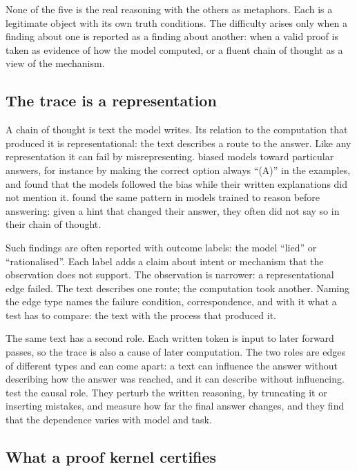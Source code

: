 None of the five is the real reasoning with the others as metaphors. Each is a legitimate
object with its own truth conditions. The difficulty arises only when a finding about one
is reported as a finding about another: when a valid proof is taken as evidence of how
the model computed, or a fluent chain of thought as a view of the mechanism.

\subsection{The trace is a representation}

A chain of thought is text the model writes. Its relation to the computation that
produced it is representational: the text describes a route to the answer. Like any
representation it can fail by misrepresenting. \citet{turpin2023} biased models toward
particular answers, for instance by making the correct option always ``(A)'' in the
examples, and found that the models followed the bias while their written explanations
did not mention it. \citet{chen2025} found the same pattern in models trained to reason
before answering: given a hint that changed their answer, they often did not say so in
their chain of thought.

Such findings are often reported with outcome labels: the model ``lied'' or
``rationalised''. Each label adds a claim about intent or mechanism that the observation
does not support. The observation is narrower: a representational edge failed. The text
describes one route; the computation took another. Naming the edge type names the
failure condition, correspondence, and with it what a test has to compare: the text
with the process that produced it.

The same text has a second role. Each written token is input to later forward passes,
so the trace is also a cause of later computation. The two roles are edges of different
types and can come apart: a text can influence the answer without describing how the
answer was reached, and it can describe without influencing. \citet{lanham2023} test the
causal role. They perturb the written reasoning, by truncating it or inserting
mistakes, and measure how far the final answer changes, and they find that the
dependence varies with model and task.

\subsection{What a proof kernel certifies}
\label{sec:kernel}

